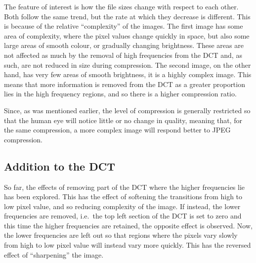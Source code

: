 The feature of interest is how the file sizes change with respect to each other. Both follow the same trend, but the rate at which they decrease is different. This is because of the relative ``complexity'' of the images. The first image has some area of complexity, where the pixel values change quickly in space, but also some large areas of smooth colour, or gradually changing brightness. These areas are not affected as much by the removal of high frequencies from the DCT and, as such, are not reduced in size during compression. The second image, on the other hand, has very few areas of smooth brightness, it is a highly complex image. This means that more information is removed from the DCT as a greater proportion lies in the high frequency regions, and so there is a higher compression ratio.

Since, as was mentioned earlier, the level of compression is generally restricted so that the human eye will notice little or no change in quality, meaning that, for the same compression, a more complex image will respond better to JPEG compression.


\subsection{Addition to the DCT} %
\label{sub:addition_to_the_dct}
So far, the effects of removing part of the DCT where the higher frequencies lie has been explored. This has the effect of softening the transitions from high to low pixel value, and so reducing complexity of the image. If instead, the lower frequencies are removed, i.e.\ the top left section of the DCT is set to zero and this time the higher frequencies are retained, the opposite effect is observed. Now, the lower frequencies are left out so that regions where the pixels vary slowly from high to low pixel value will instead vary more quickly. This has the reversed effect of ``sharpening'' the image.

